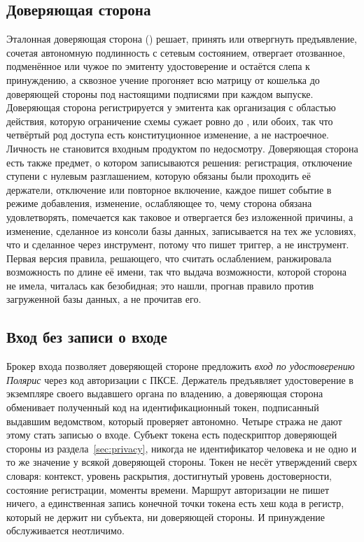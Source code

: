 \subsection{Доверяющая сторона}

Эталонная доверяющая сторона () решает, принять или
отвергнуть предъявление, сочетая автономную подлинность с сетевым состоянием, отвергает отозванное,
подменённое или чужое по эмитенту удостоверение и остаётся слепа к принуждению, а сквозное учение
прогоняет всю матрицу от кошелька до доверяющей стороны под настоящими подписями при каждом
выпуске. Доверяющая сторона регистрируется у эмитента как организация с областью действия, которую
ограничение схемы сужает ровно до ,  или обоих, так что четвёртый
род доступа есть конституционное изменение, а не настроечное. Личность не становится входным
продуктом по недосмотру. Доверяющая сторона есть также предмет, о котором
записываются решения: регистрация, отключение ступени с нулевым разглашением, которую обязаны были
проходить её держатели, отключение или повторное включение, каждое пишет событие в режиме
добавления, изменение, ослабляющее то, чему сторона обязана удовлетворять, помечается как таковое
и отвергается без изложенной причины, а изменение, сделанное из консоли базы данных, записывается
на тех же условиях, что и сделанное через инструмент, потому что пишет триггер, а не инструмент.
Первая версия правила, решающего, что считать ослаблением, ранжировала возможность по длине её
имени, так что выдача возможности, которой сторона не имела, читалась как безобидная; это нашли,
прогнав правило против загруженной базы данных, а не прочитав его. \sImpl

\subsection{Вход без записи о входе}

Брокер входа позволяет доверяющей стороне предложить \emph{вход по удостоверению Полярис} через
код авторизации с ПКСЕ. Держатель предъявляет удостоверение в экземпляре своего выдавшего органа по
владению, а доверяющая сторона обменивает полученный код на идентификационный токен, подписанный
выдавшим ведомством, который проверяет автономно. Четыре стража не дают этому стать записью о
входе. Субъект токена есть подескриптор доверяющей стороны из раздела~\ref{sec:privacy}, никогда не
идентификатор человека и не одно и то же значение у всякой доверяющей
стороны. Токен не несёт утверждений сверх словаря: контекст, уровень раскрытия, достигнутый уровень
достоверности, состояние регистрации, моменты времени. Маршрут авторизации не пишет ничего, а
единственная запись конечной точки токена есть хеш кода в регистр, который не держит ни субъекта,
ни доверяющей стороны. И принуждение обслуживается неотличимо. \sImpl


